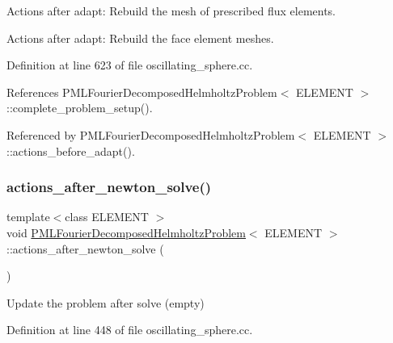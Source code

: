 Actions after adapt\+: Rebuild the mesh of prescribed flux elements. 

Actions after adapt\+: Rebuild the face element meshes. 

Definition at line 623 of file oscillating\+\_\+sphere.\+cc.



References P\+M\+L\+Fourier\+Decomposed\+Helmholtz\+Problem$<$ E\+L\+E\+M\+E\+N\+T $>$\+::complete\+\_\+problem\+\_\+setup().



Referenced by P\+M\+L\+Fourier\+Decomposed\+Helmholtz\+Problem$<$ E\+L\+E\+M\+E\+N\+T $>$\+::actions\+\_\+before\+\_\+adapt().

\mbox{\label{classPMLFourierDecomposedHelmholtzProblem_a013d95d489b85e326a71bb744af4a40f}} 
\subsubsection{\texorpdfstring{actions\+\_\+after\+\_\+newton\+\_\+solve()}{actions\_after\_newton\_solve()}}
{\footnotesize\ttfamily template$<$class E\+L\+E\+M\+E\+NT $>$ \\
void \hyperlink{classPMLFourierDecomposedHelmholtzProblem}{P\+M\+L\+Fourier\+Decomposed\+Helmholtz\+Problem}$<$ E\+L\+E\+M\+E\+NT $>$\+::actions\+\_\+after\+\_\+newton\+\_\+solve (\begin{DoxyParamCaption}{ }\end{DoxyParamCaption})\hspace{0.3cm}{\ttfamily [inline]}}



Update the problem after solve (empty) 



Definition at line 448 of file oscillating\+\_\+sphere.\+cc.

\mbox{\label{classPMLFourierDecomposedHelmholtzProblem_ae4b1cacec10553bdb6781b65ed73abce}} 
